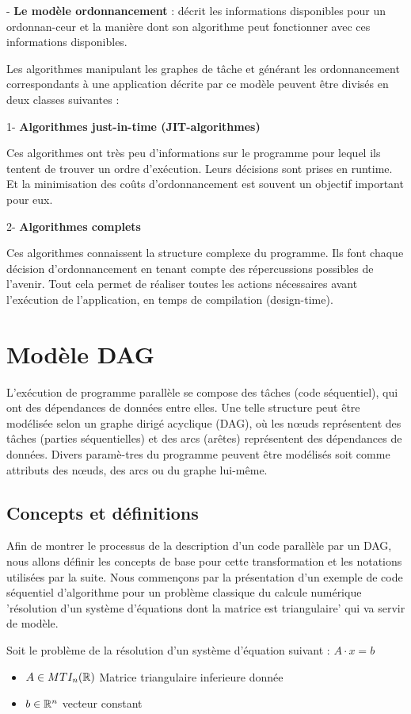 - \textbf{Le modèle ordonnancement} : décrit les informations disponibles pour un ordonnan-ceur et la manière dont son algorithme peut fonctionner avec ces informations disponibles.

Les algorithmes manipulant les graphes de tâche et générant les ordonnancement correspondants à une application décrite par ce modèle peuvent être divisés en deux classes suivantes :

1- \textbf{Algorithmes just-in-time (JIT-algorithmes)} 

Ces algorithmes ont très peu d'informations sur le programme pour lequel ils tentent de trouver un ordre d'exécution. 
Leurs décisions sont prises en runtime. 
Et la minimisation des coûts d'ordonnancement est souvent un objectif important pour eux. 

2- \textbf{Algorithmes complets}

Ces algorithmes connaissent la structure complexe du programme. %
Ils font chaque décision d'ordonnancement en tenant compte des répercussions possibles de l'avenir. 
Tout cela permet de réaliser toutes les actions nécessaires avant l'exécution de l'application, en temps de compilation (design-time). 
\section{Modèle DAG} \label{modelDAG}
%
L'exécution de programme parallèle se compose des tâches (code séquentiel), qui ont des dépendances de données entre elles. 
Une telle structure peut être modélisée selon un graphe dirigé acyclique (DAG), où 
les nœuds représentent des tâches (parties séquentielles) et 
des arcs (arêtes) représentent des dépendances de données. 
Divers paramè-tres du programme peuvent être modélisés soit comme attributs des nœuds, des arcs ou du graphe lui-même. 
%
\subsection{Concepts et définitions} 
%
Afin de montrer le processus de la description d'un code parallèle par un DAG, nous allons définir les concepts de base pour cette transformation et les notations utilisées par la suite. 
Nous commençons par la présentation d'un exemple de code séquentiel d'algorithme pour un problème classique du calcule numérique 'résolution d'un système d'équations dont la matrice est triangulaire' qui va servir de modèle.
  
Soit le problème de la résolution d'un système d'équation suivant : $A\cdot x=b$ \\
\begin{itemize}
    \item $A \in MTI_n(\mathbb{R})$ Matrice triangulaire inferieure donnée
    \item $b \in\mathbb{R}^n$ vecteur constant
\end{itemize}


